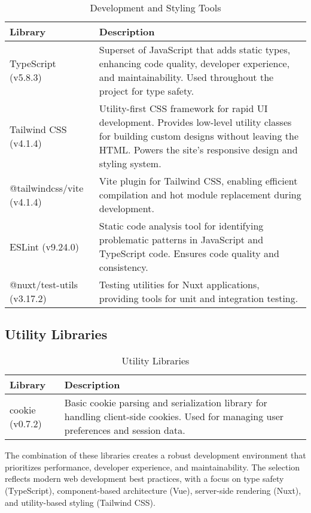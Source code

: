 \begin{table}[H]
    \centering
    \setlength{\tabcolsep}{5pt}
    \renewcommand{\arraystretch}{1.2} 
    \begin{tabular}{|p{3.5cm}|p{10.8cm}|}
        \hline
        \rowcolor{bluepoli!20}
        \textbf{Library} & \textbf{Description} \\
        \hline
        TypeScript (v5.8.3) & Superset of JavaScript that adds static types, enhancing code quality, developer experience, and maintainability. Used throughout the project for type safety. \\
        \hline
        Tailwind CSS (v4.1.4) & Utility-first CSS framework for rapid UI development. Provides low-level utility classes for building custom designs without leaving the HTML. Powers the site's responsive design and styling system. \\
        \hline
        @tailwindcss/vite (v4.1.4) & Vite plugin for Tailwind CSS, enabling efficient compilation and hot module replacement during development. \\
        \hline
        ESLint (v9.24.0) & Static code analysis tool for identifying problematic patterns in JavaScript and TypeScript code. Ensures code quality and consistency. \\
        \hline
        @nuxt/test-utils (v3.17.2) & Testing utilities for Nuxt applications, providing tools for unit and integration testing. \\
        \hline
    \end{tabular}
    \caption{Development and Styling Tools}
\end{table}

\subsection{Utility Libraries}

\begin{table}[H]
    \centering
    \setlength{\tabcolsep}{5pt}
    \renewcommand{\arraystretch}{1.2} 
    \begin{tabular}{|p{3.5cm}|p{10.8cm}|}
        \hline
        \rowcolor{bluepoli!20}
        \textbf{Library} & \textbf{Description} \\
        \hline
        cookie (v0.7.2) & Basic cookie parsing and serialization library for handling client-side cookies. Used for managing user preferences and session data. \\
        \hline
    \end{tabular}
    \caption{Utility Libraries}
\end{table}

The combination of these libraries creates a robust development environment that prioritizes performance, developer experience, and maintainability. The selection reflects modern web development best practices, with a focus on type safety (TypeScript), component-based architecture (Vue), server-side rendering (Nuxt), and utility-based styling (Tailwind CSS).
